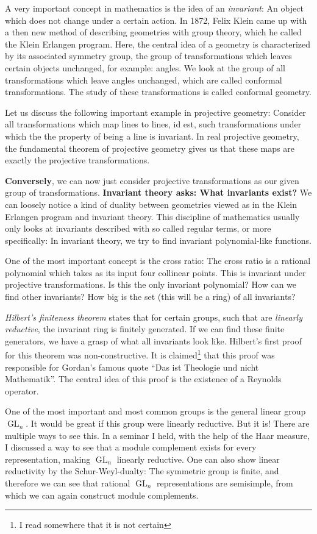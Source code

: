 A very important concept in mathematics is the idea of an \textit{invariant}:
An object which does not change under a certain action.
In 1872, Felix Klein came up with a then new method of describing geometries with group theory, which he called the Klein Erlangen program.
Here, the central idea of a geometry is characterized by its associated symmetry group, the group of transformations which leaves certain objects unchanged, for example: angles.
We look at the group of all transformations which leave angles unchanged, which are called conformal transformations.
The study of these transformations is called conformal geometry.

Let us discuss the following important example in projective geometry:
Consider all transformations which map lines to lines, id est, such transformations under which the the property of being a line is invariant.
In real projective geometry, the fundamental theorem of projective geometry gives us that these maps are exactly the projective transformations.

\textbf{Conversely}, we can now just consider projective transformations as our given group of transformations.
\textbf{Invariant theory asks: What invariants exist?}
We can loosely notice a kind of duality between geometries viewed as in the Klein Erlangen program and invariant theory.
This discipline of mathematics usually only looks at invariants described with so called regular terms, or more specifically:  In invariant theory, we try to find invariant polynomial-like functions.

One of the most important concept is the cross ratio:
The cross ratio is a rational polynomial which takes as its input four collinear points.
This is invariant under projective transformations.
Is this the only invariant polynomial?
How can we find other invariants?
How big is the set (this will be a ring) of all invariants?

\textit{Hilbert's finiteness theorem} states that for certain groups, such that are \textit{linearly reductive}, the invariant ring is finitely generated.
If we can find these finite generators, we have a grasp of what all invariants look like.
Hilbert's first proof for this theorem was non-constructive.
It is claimed\footnote{I read somewhere that it is not certain} that this proof was responsible for Gordan's famous quote ``Das ist Theologie und nicht Mathematik''.
The central idea of this proof is the existence of a Reynolds operator.

One of the most important and most common groups is the general linear group $\operatorname{GL}_n$.
It would be great if this group were linearly reductive.
But it is!
There are multiple ways to see this.
In a seminar I held, with the help of the Haar measure, I discussed a way to see that a module complement exists for every representation, making $\operatorname{GL}_n$ linearly reductive.
One can also show linear reductivity by the Schur-Weyl-dualty:  The symmetric group is finite, and therefore we can see that rational $\operatorname{GL}_n$ representations are semisimple, from which we can again construct module complements.

